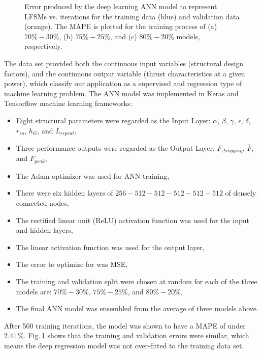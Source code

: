 \begin{figure}
{                    \label{fig:chapter/rsm/LFSM/training result/MAPE_80_20}
                }
                \caption{
                    Error produced by the deep learning ANN model to represent \acsp{LFSM} vs. iterations for the training data (blue) and validation data (orange). The \acs{MAPE} is plotted for the training process of (a) $70\%-30\%$, (b) $75\%-25\%$, and (c) $80\%-20\%$ models, respectively.
                }   \label{fig:chapter/rsm/LFSM/training result}
            \end{figure}
        
        
            The data set provided both the continuous input variables (structural design factors), and the continuous output variable (thrust characteristics at a given power), which classify our application as a supervised and regression type of machine learning problem. The \acs{ANN} model was implemented in Keras and Tensorflow machine learning frameworks:

            
            \begin{itemize}
                \item Eight structural parameters were regarded as the Input Layer: $\alpha$, $\beta$, $\gamma$, $\epsilon$, $\delta$, $r_{so}$, $h_G$, and $L_{repeat}$,
                \item Three performance outputs were regarded as the Output Layer: $F_{\Delta cogging}$, $\overline{F}$, and $F_{peak}$,
                \item The $\mathrm{Adam}$ optimizer was used for \acs{ANN} training,
                \item There were six hidden layers of $256-512-512-512-512-512$ of densely connected nodes,
                \item The rectified linear unit (ReLU) activation function was used
for the input and hidden layers,
                \item The linear activation function was used for the output layer,
                \item The error to optimize for was \acs{MSE},
                \item The training and validation split were chosen at random for each of the three models are: $70\%-30\%$, $75\%-25\%$, and $80\%-20\%$,
                \item The final \acs{ANN} model was ensembled from the average of three models above.
            \end{itemize}


            After 500 training iterations, the model was shown to have a \acf{MAPE} of under $2.41\,\%$. Fig.\,\ref{fig:chapter/rsm/LFSM/training result} shows that the training and validation errors were similar, which means the deep regression model was not over-fitted to the training data set.
        
